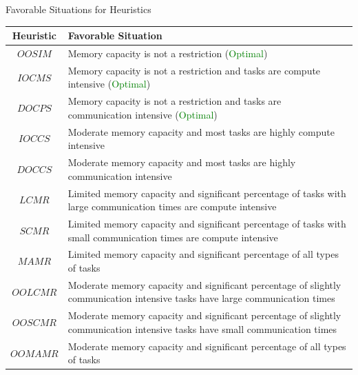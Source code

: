 \documentclass[mathserif,hyperref={pdfpagemode=FullScreen}]{beamer}
\begin{document}
\begin{frame}{Favorable Situations for Heuristics}
\scriptsize
\begin{center}
\begin{tabular}{|c|p{9 cm}|}
	\hline
	\textbf{Heuristic} & \textbf{\hspace{2cm}Favorable Situation} \\ \hline
	$OOSIM$ & Memory capacity is not a restriction (\textcolor{green}{Optimal}) \\ \hline
	$IOCMS$ & Memory capacity is not a restriction and tasks are compute intensive (\textcolor{green}{Optimal}) \\ \hline
	$DOCPS$ & Memory capacity is not a restriction and tasks are communication intensive (\textcolor{green}{Optimal}) \\ \hline
	$IOCCS$ & Moderate memory capacity and most tasks are highly compute intensive \\ \hline
	$DOCCS$ & Moderate memory capacity and most tasks are highly communication intensive \\ \hline
	$LCMR$ & Limited memory capacity and significant percentage of tasks with large communication times are compute intensive\\ \hline
	$SCMR$ & Limited memory capacity and significant percentage of tasks with small communication times are compute intensive\\ \hline
	$MAMR$ & Limited memory capacity and significant percentage of all types of tasks\\ \hline
	$OOLCMR$ & Moderate memory capacity and significant percentage of slightly communication intensive tasks have large communication times\\ \hline
	$OOSCMR$ & Moderate memory capacity and significant percentage of slightly communication intensive tasks have small communication times\\ \hline
	$OOMAMR$ & Moderate memory capacity and significant percentage of all types of tasks \\ \hline
\end{tabular}
\end{center}
\end{frame}
\end{document}
